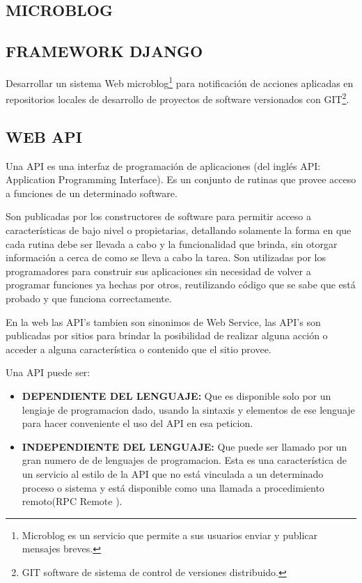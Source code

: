 \subsection{MICROBLOG}

\subsection{FRAMEWORK DJANGO}
Desarrollar un sistema Web microblog\footnote{Microblog es un servicio que permite a sus usuarios enviar y publicar mensajes breves.
} para notificación de acciones aplicadas en repositorios locales de desarrollo de proyectos de software versionados con GIT\footnote{GIT software de sistema de control de versiones distribuido.
}.

\subsection{WEB API}
Una API es una interfaz de programación de aplicaciones (del inglés API: Application Programming Interface). Es un conjunto de rutinas que provee acceso a funciones de un determinado software.

Son publicadas por los constructores de software para permitir acceso a características de bajo nivel o propietarias, detallando solamente la forma en que cada rutina debe ser llevada a cabo y la funcionalidad que brinda, sin otorgar información a cerca de como se lleva a cabo la tarea. Son utilizadas por los programadores para construir sus aplicaciones sin necesidad de volver a programar funciones ya hechas por otros, reutilizando código que se sabe que está probado y que funciona correctamente.

En la web las API's tambien son sinonimos de Web Service, las API's son publicadas por sitios para brindar la posibilidad de realizar alguna acción o acceder a alguna característica o contenido que el sitio provee. 

Una API puede ser:

\begin{itemize}
 \item \textbf{DEPENDIENTE DEL LENGUAJE:} Que es disponible solo por un lengiaje de programacion dado, usando la sintaxis y elementos de ese lenguaje para hacer conveniente el uso del API en esa peticion.
 \item \textbf{INDEPENDIENTE DEL LENGUAJE:} Que puede ser llamado por un gran numero de de lenguajes de programacion. Esta es una característica de un servicio al estilo de la API que no está vinculada a un determinado proceso o sistema y está disponible como una llamada a procedimiento remoto(RPC Remote ).
\end{itemize}

